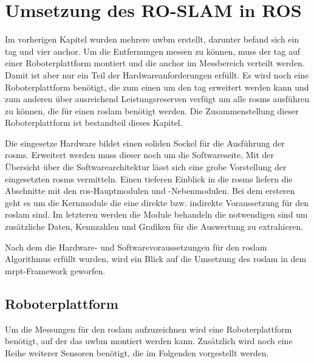 %
%
%
\chapter{Umsetzung des RO-SLAM in ROS}
\label{ch:ro_slam}

Im vorherigen Kapitel wurden mehrere \gls{uwbm} erstellt, darunter befand sich ein \gls{tag} und vier \gls{anchor}. Um die Entfernungen messen zu können, muss der \gls{tag} auf einer Roboterplattform montiert und die \gls{anchor} im Messbereich verteilt werden. Damit ist aber nur ein Teil der Hardwareanforderungen erfüllt. Es wird noch eine Roboterplattform benötigt, die zum einen um den \gls{tag} erweitert werden kann und zum anderen über ausreichend Leistungsreserven verfügt um alle \glspl{rosm} ausführen zu können, die für einen \gls{roslam} benötigt werden. Die Zusammenstellung dieser Roboterplattform ist bestandteil dieses Kapitel.

Die eingesetze Hardware bildet einen soliden Sockel für die Ausführung der \glspl{rosm}. Erweitert werden muss dieser noch um die Softwareseite. Mit der Übersicht über die Softwarearchitektur lässt sich eine grobe Vorstellung der eingesetzten \glspl{rosm} vermitteln. Einen tieferen Einblick in die \glspl{rosm} liefern die Abschnitte mit den \gls{ros}-Hauptmodulen und -Nebenmodulen. Bei dem ersteren geht es um die Kernmodule die eine direkte bzw. indirekte Voraussetzung für den \gls{roslam} sind. Im letzteren werden die Module behandeln die notwendigen sind um zusätzliche Daten, Kennzahlen und Grafiken für die Auswertung zu extrahieren.

Nach dem die Hardware- und Softwarevoraussetzungen für den \gls{roslam} Algorithmus erfüllt wurden, wird ein Blick auf die Umsetzung des \gls{roslam} in dem \gls{mrpt}-Framework geworfen.


%
%
\section{Roboterplattform}

Um die Messungen für den \Gls{roslam} aufzuzeichnen wird eine Roboterplattform benötigt, auf der das \Gls{uwbm} montiert werden kann. Zusätzlich wird noch eine Reihe weiterer Sensoren benötigt, die im Folgenden vorgestellt werden.

